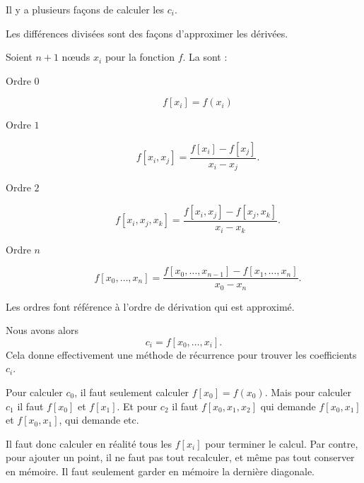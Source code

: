 Il y a plusieurs façons de calculer les \( c_i\).

Les différences divisées sont des façons d'approximer les dérivées.
\begin{definition}
    Soient \( n+1\) nœuds \( x_i\) pour la fonction \( f\). La  sont :
    \begin{description}
        \item[Ordre \( 0\)]
            \begin{equation}
                f[x_i]=f(x_i)
            \end{equation}
        \item[Ordre \( 1\)]
            \begin{equation}
                f[x_i,x_j]=\frac{ f[x_i]-f[x_j] }{ x_i-x_j }.
            \end{equation}
        \item[Ordre \( 2\)]
            \begin{equation}
                f[x_i,x_j,x_k]=\frac{ f[x_i,x_j]-f[x_j,x_k] }{ x_i-x_k }.
            \end{equation}
        \item[Ordre \( n\)]
            \begin{equation}
                f[x_0,\ldots, x_n]=\frac{ f[x_0,\ldots, x_{n-1}]-f[x_1,\ldots, x_n] }{ x_0-x_n }.
            \end{equation}
    \end{description}
\end{definition}
Les ordres font référence à l'ordre de dérivation qui est approximé.

Nous avons alors
\begin{equation}
    c_i=f[x_0,\ldots, x_i].
\end{equation}
Cela donne effectivement une méthode de récurrence pour trouver les coefficients \( c_i\).

\begin{remark}
    Pour calculer \( c_0\), il faut seulement calculer \( f[x_0]=f(x_0)\). Mais pour calculer \( c_1\) il faut \( f[x_0] \) et \( f[x_1]\). Et pour \( c_2\) il faut \( f[x_0,x_1,x_2]\) qui demande \( f[x_0,x_1]\) et \( f[x_0,x_1]\), qui demande etc.

    Il faut donc calculer en réalité tous les \( f[x_i]\) pour terminer le calcul. Par contre, pour ajouter un point, il ne faut pas tout recalculer, et même pas tout conserver en mémoire. Il faut seulement garder en mémoire la dernière diagonale.
\end{remark}

